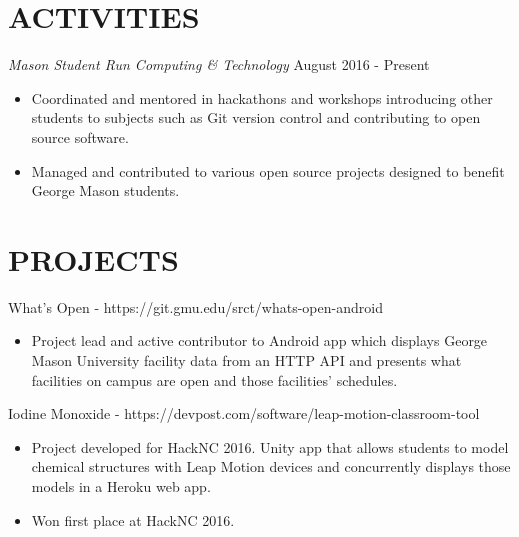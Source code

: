\documentclass[margin, 10pt]{res} %
\begin{document}
\begin{resume}
\section{ACTIVITIES}

{\sl Mason Student Run Computing \& Technology} \hfill August 2016 - Present
\begin{itemize}
\item Coordinated and mentored in hackathons and workshops introducing other students to subjects such as Git version control and contributing to open source software.
\item Managed and contributed to various open source projects designed to benefit George Mason students.
\end{itemize} 




\section{PROJECTS} 

What's Open - https://git.gmu.edu/srct/whats-open-android
\begin{itemize}
\item Project lead and active contributor to Android app which displays George Mason University facility data from an HTTP API and presents what facilities on campus are open and those facilities' schedules.
\end{itemize}

Iodine Monoxide - https://devpost.com/software/leap-motion-classroom-tool
\begin{itemize}
\item Project developed for HackNC 2016. Unity app that allows students to model chemical structures with Leap Motion devices and concurrently displays those models in a Heroku web app.
\item Won first place at HackNC 2016.
\end{itemize}


\end{resume}
\end{document}
